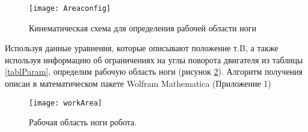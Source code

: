 \begin{figure}[h]
	\begin{center}
		\texttt{[image: Areaconfig]}
		\caption{Кинематическая схема для определения рабочей области ноги}
		\label{Areaconfig}
	\end{center}
\end{figure}

Используя данные уравнения, которые описывают положение т.B, а также используя информацию об ограничениях на углы поворота двигателя из таблицы \ref{tablParam}, определим рабочую область ноги (рисунок \ref{workArea}). Алгоритм получения описан в математическом пакете Wolfram Mathematica (Приложение 1) %

\begin{figure}[h]
	\begin{center}
		\texttt{[image: workArea]}
		\caption{Рабочая область ноги робота.}
		\label{workArea}
	\end{center}
\end{figure}